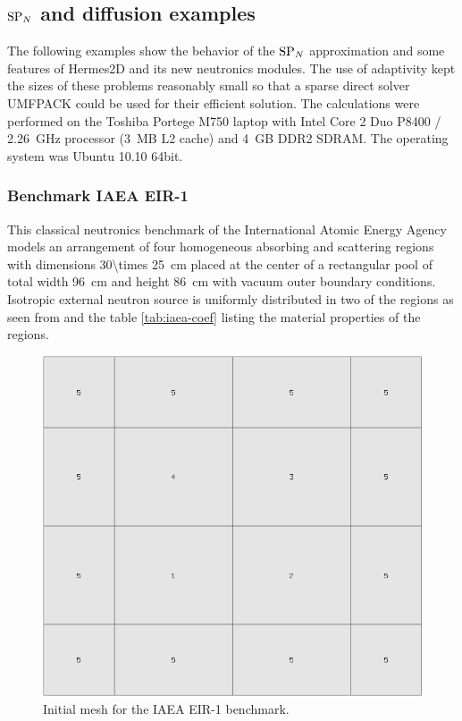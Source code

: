 \subsection{$\text{SP}_{N}$ and diffusion examples} \label{sec:ex_spn}

The following examples show the behavior of the $\text{SP}_{N}$ approximation and some features of Hermes2D and its
new neutronics modules. The use of adaptivity kept the sizes of these problems reasonably small so that a sparse direct
solver UMFPACK \cite{UMFPACK} could be used for their efficient solution. The calculations were performed on the Toshiba
Portege M750 laptop with Intel Core 2 Duo P8400 / \SI{2.26}{GHz} processor (\SI{3}{MB} L2 cache) and \SI{4}{GB}  DDR2
SDRAM. The operating system was Ubuntu 10.10 64bit.

\subsubsection{Benchmark IAEA EIR-1}\label{sec:iaea}
This classical neutronics benchmark of the International Atomic Energy Agency models an arrangement of four homogeneous
absorbing and scattering regions with dimensions \SI{30\times 25}{cm} placed at the center of a rectangular pool of
total width \SI{96}{cm} and height \SI{86}{cm} with vacuum outer boundary conditions. Isotropic external neutron source
is uniformly distributed in two of the regions as seen from  and the table \ref{tab:iaea-coef} listing the material properties of the regions.
\begin{figure}[!htb]
\centering
  \includegraphics[scale=.2]{saphir/mesh.png}
  \caption[Initial mesh for the IAEA EIR-1 benchmark]{Initial mesh for the IAEA EIR-1 benchmark.}
  \label{fig:40}
\end{figure}

